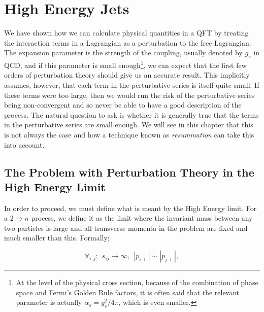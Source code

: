 \chapter{High Energy Jets}


We have shown how we can calculate physical quantities in a QFT by treating the interaction terms in a Lagrangian as a perturbation to the free Lagrangian. The expansion parameter is the strength of the coupling, usually denoted by $g_s$ in QCD, and if this parameter is small enough\footnote{At the level of the physical cross section, because of the combination of phase space and Fermi's Golden Rule factors, it is often said that the relevant parameter is actually $\alpha_s = g_s^2/4 \pi$, which is even smaller.}, we can expect that the first few orders of perturbation theory should give us an accurate result. This implicitly assumes, however, that each term in the perturbative series is itself quite small. If these terms were too large, then we would run the risk of the perturbative series being non-convergent and so never be able to have a good description of the process. The natural question to ask is whether it is generally true that the terms in the perturbative series are small enough. We will see in this chapter that this is not always the case and how a technique known as \emph{resummation} can take this into account. 

\section{The Problem with Perturbation Theory in the High Energy Limit}
In order to proceed, we must define what is meant by the High Energy limit. For a $2 \to n$ process, we define it as the limit where the invariant mass between any two particles is large and all transverse momenta in the problem are fixed and much smaller than this. Formally; 

\begin{equation}
\forall_{i,j}:  \hspace{5pt} s_{ij} \to \infty, \hspace{5pt} |p_{i \perp}| \sim |p_{j \perp}|,
\end{equation}

